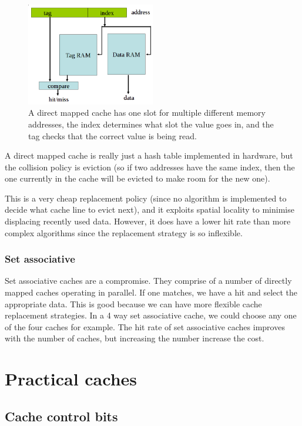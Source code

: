 \begin{figure}[h]
  \centering
  \includegraphics[width=0.5\textwidth]{images/direct-mapped-cache}
  \caption{A direct mapped cache has one slot for multiple different memory
  addresses, the index determines what slot the value goes in, and the tag
  checks that the correct value is being read.}
  \label{fig:direct-mapped-cache}
\end{figure}

A direct mapped cache is really just a hash table implemented in hardware, but
the collision policy is eviction (so if two addresses have the same index, then
the one currently in the cache will be evicted to make room for the new one).

This is a very cheap replacement policy (since no algorithm is implemented to
decide what cache line to evict next), and it exploits spatial locality to
minimise displacing recently used data. However, it does have a lower hit rate
than more complex algorithms since the replacement strategy is so inflexible.

\subsubsection{Set associative}

Set associative caches are a compromise. They comprise of a number of directly
mapped caches operating in parallel. If one matches, we have a hit and select
the appropriate data. This is good because we can have more flexible cache
replacement strategies. In a 4 way set associative cache, we could choose any
one of the four caches for example. The hit rate of set associative caches
improves with the number of caches, but increasing the number increase the cost.

\section{Practical caches}

\subsection{Cache control bits}

